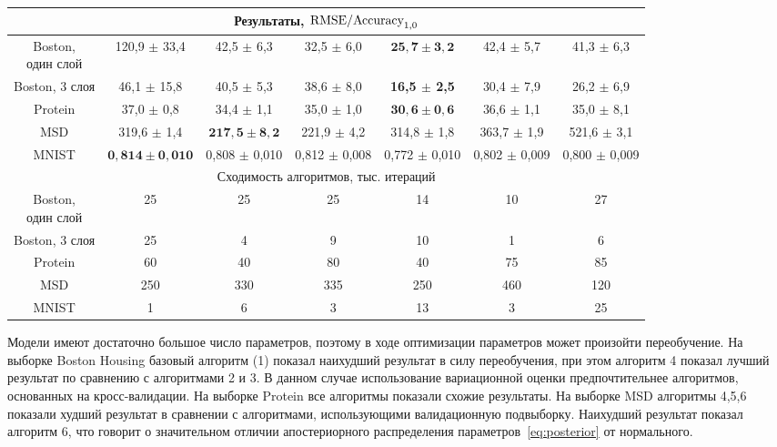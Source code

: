 \documentclass[12pt]{a&t}
\begin{document}
\begin{table}[htbp!]
\begin{tabular}{ | c | c | c | c | c | c | c |}
\multicolumn{7}{|c|}{Результаты, $\textnormal{RMSE/Accuracy}_{1,0}$}  \\
\hline
\specialcell{ Boston,  \\один  слой} & 120,9 $\pm$ 33,4 & 42,5 $\pm$ 6,3 & 32,5 $\pm$ 6,0 & $\mathbf{25,7 \pm 3,2}$ & 42,4 $\pm$ 5,7 & 41,3 $\pm$ 6,3  \\
\hline
Boston, 3 слоя & 46,1 $\pm$ 15,8 & 40,5 $\pm$ 5,3 & 38,6 $\pm$ 8,0 & \bf 16,5 $\pm$ 2,5 & 30,4 $\pm$ 7,9 & 26,2 $\pm$ 6,9 \\
\hline
Protein & 37,0 $\pm$ 0,8 & 34,4 $\pm$ 1,1 & 35,0 $\pm$ 1,0 & $\mathbf{30,6 \pm 0,6}$ & 36,6 $\pm$ 1,1 & 35,0 $\pm$ 8,1 \\
\hline
MSD & 319,6 $\pm$ 1,4 & $\mathbf{217,5 \pm 8,2}$ & 221,9 $\pm$ 4,2 & 314,8 $\pm$ 1,8 & 363,7 $\pm$ 1,9 & 521,6 $\pm$ 3,1  \\
\hline
MNIST & $\mathbf{0,814 \pm 0,010 }$& 0,808 $\pm$ 0,010 &  0,812 $\pm$ 0,008 & 0,772 $\pm$ 0,010 & 0,802 $\pm$ 0,009 & 0,800 $\pm$ 0,009 \\
\hline


\multicolumn{7}{|c|}{Сходимость алгоритмов, тыс. итераций  }  \\
\hline
\specialcell{ Boston,  \\один  слой} &  25 & 25 & 25 & 14 & 10 & 27 \\
\hline
Boston, 3 слоя &  25 & 4 & 9 & 10 & 1 & 6 \\
\hline
Protein &   60 & 40 & 80 & 40 & 75 & 85 \\
\hline
MSD &  250 & 330 & 335 &  250 & 460 & 120  \\
\hline
MNIST &  1 & 6 & 3 &  13 & 3 & 25  \\
\hline
\end{tabular}
\end{table}





Модели имеют достаточно большое число параметров, поэтому в ходе оптимизации параметров может произойти переобучение. На выборке Boston Housing базовый алгоритм (1) показал наихудший результат в силу переобучения, при этом алгоритм 4 показал лучший результат по сравнению с алгоритмами 2 и 3. 
В данном случае использование вариационной оценки предпочтительнее алгоритмов, основанных на кросс-валидации. На выборке Protein все алгоритмы показали схожие результаты. На выборке MSD алгоритмы 4,5,6 показали худший результат в сравнении с алгоритмами, использующими валидационную подвыборку. Наихудший результат показал алгоритм 6, что говорит о значительном отличии апостериорного распределения параметров~\eqref{eq:posterior} от нормального.  
\end{document}
